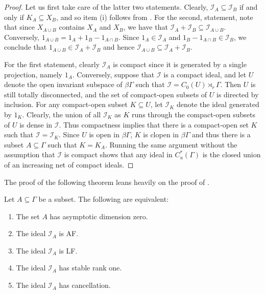 \documentclass[12pt, a4paper, oneside]{amsart}
\newcommand{\0}{\mathbf{0}}
\newcommand{\1}{\mathbf{1}}
\newcommand{\I}{\mathscr{I}}
\begin{document}
	\begin{proof}
		Let us first take care of the latter two statements. Clearly, \(\I_A \subseteq \I_B\) if and only if \(K_A \subseteq X_B\), and so item (i) follows from \cite[Lemma 2.5]{kellerhals}. For the second, statement, note that since \(X_{A \cup B}\) contains \(X_A\) and \(X_B\), we have that \(\I_A + \I_B \subseteq \I_{A \cup B}\). Conversely, \(1_{A \cup B} = 1_A + 1_B - 1_{A \cap B}\). Since \(1_A \in \I_A\) and \(1_B - 1_{A \cap B} \in \I_B\), we conclude that \(1_{A \cup B} \in \I_A + \I_B\) and hence \(\I_{A \cup B} \subseteq \I_A + \I_B\). 
		
		For the first statement, clearly \(\I_A\) is compact since it is generated by a single projection, namely \(1_A\). Conversely, suppose that \(\I\) is a compact ideal, and let \(U\) denote the open invariant subspace of \(\beta \Gamma\) such that \(\I = C_0(U) \rtimes_r \Gamma\). Then \(U\) is still totally disconnected, and the set of compact-open subsets of \(U\) is directed by inclusion. For any compact-open subset \(K \subseteq U\), let \(\I_K\) denote the ideal generated by \(1_K\). Clearly, the union of all \(\I_K\) as \(K\) runs through the compact-open subsets of \(U\) is dense in \(\I\). Thus compactness implies that there is a compact-open set \(K\) such that \(\I = \I_K\). Since \(U\) is open in \(\beta \Gamma\), \(K\) is clopen in \(\beta \Gamma\) and thus there is a subset \(A \subseteq \Gamma\) such that \(K = K_A\). Running the same argument without the assumption that \(\I\) is compact shows that any ideal in \(C_u^*(\Gamma)\) is the closed union of an increasing net of compact ideals. 
	\end{proof}
	
	The proof of the following theorem leans heavily on the proof of \cite[Theorem 2.2]{li2018low}. 
	
	\begin{theorem}
		\label{thm_AF_ideals}
		Let \(A \subseteq \Gamma\) be a subset. The following are equivalent: 
		\begin{enumerate}
			\item The set \(A\) has asymptotic dimension zero. 
			\item The ideal \(\I_A\) is AF. 
			\item The ideal \(\I_A\) is LF. 
			\item The ideal \(\I_A\) has stable rank one. 
			\item The ideal \(\I_A\) has cancellation. 
		\end{enumerate} 
	\end{theorem}
	
\end{document}
